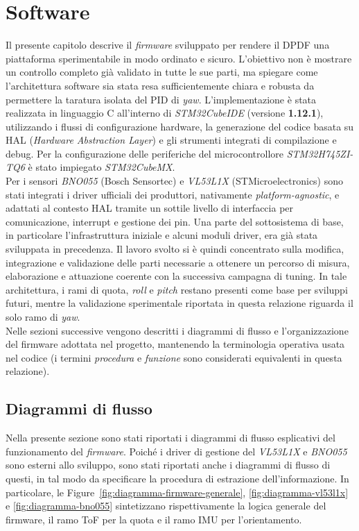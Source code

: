 \documentclass[11pt]{report}
\begin{document}
	\chapter{Software}
	Il presente capitolo descrive il \textit{firmware} sviluppato per rendere il DPDF una piattaforma sperimentabile in modo ordinato e sicuro. L'obiettivo non è mostrare un controllo completo già validato in tutte le sue parti, ma spiegare come l'architettura software sia stata resa sufficientemente chiara e robusta da permettere la taratura isolata del PID di \textit{yaw}.
	L'implementazione è stata realizzata in linguaggio C all'interno di \textit{STM32CubeIDE} (versione \textbf{1.12.1}), utilizzando i flussi di configurazione hardware, la generazione del codice basata su HAL (\textit{Hardware Abstraction Layer}) e gli strumenti integrati di compilazione e debug. Per la configurazione delle periferiche del microcontrollore \textit{STM32H745ZI-TQ6} è stato impiegato \textit{STM32CubeMX}.\\
	Per i sensori \textit{BNO055} (Bosch Sensortec) e \textit{VL53L1X} (STMicroelectronics) sono stati integrati i driver ufficiali dei produttori, nativamente \textit{platform-agnostic}, e adattati al contesto HAL tramite un sottile livello di interfaccia per comunicazione, interrupt e gestione dei pin.
	Una parte del sottosistema di base, in particolare l'infrastruttura iniziale e alcuni moduli driver, era già stata sviluppata in precedenza. Il lavoro svolto si è quindi concentrato sulla modifica, integrazione e validazione delle parti necessarie a ottenere un percorso di misura, elaborazione e attuazione coerente con la successiva campagna di tuning. In tale architettura, i rami di quota, \textit{roll} e \textit{pitch} restano presenti come base per sviluppi futuri, mentre la validazione sperimentale riportata in questa relazione riguarda il solo ramo di \textit{yaw}.\\
	Nelle sezioni successive vengono descritti i diagrammi di flusso e l'organizzazione del firmware adottata nel progetto, mantenendo la terminologia operativa usata nel codice (i termini \textit{procedura} e \textit{funzione} sono considerati equivalenti in questa relazione).
	
	\section{Diagrammi di flusso}
	Nella presente sezione sono stati riportati i diagrammi di flusso esplicativi del funzionamento del \textit{firmware}. Poiché i driver di gestione del \textit{VL53L1X} e \textit{BNO055} sono esterni allo sviluppo, sono stati riportati anche i diagrammi di flusso di questi, in tal modo da specificare la procedura di estrazione dell'informazione. In particolare, le Figure~\ref{fig:diagramma-firmware-generale}, \ref{fig:diagramma-vl53l1x} e \ref{fig:diagramma-bno055} sintetizzano rispettivamente la logica generale del firmware, il ramo ToF per la quota e il ramo IMU per l'orientamento.
	
\end{document}
